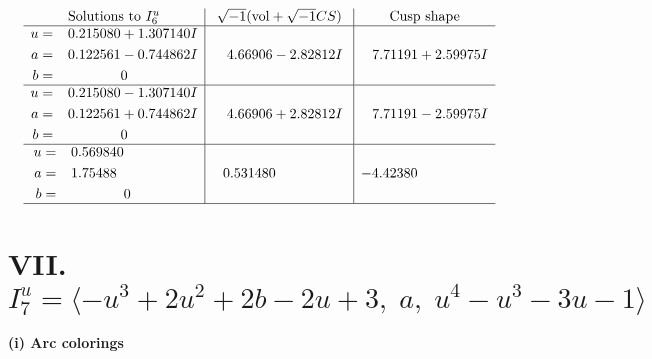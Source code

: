 \documentclass[1p]{elsarticle_modified}
\theoremstyle{definition}
\newcommand{\I}{\sqrt{-1}}
\begin{document}
$$\begin{array}{c|c|c}  
\text{Solutions to }I^u_{6}& \I (\text{vol} + \sqrt{-1}CS) & \text{Cusp shape}\\
 \hline 
\begin{aligned}
u &= \phantom{-}0.215080 + 1.307140 I \\
a &= \phantom{-}0.122561 - 0.744862 I \\
b &= \phantom{-0.000000 } 0\end{aligned}
 & \phantom{-}4.66906 - 2.82812 I & \phantom{-}7.71191 + 2.59975 I \\ \hline\begin{aligned}
u &= \phantom{-}0.215080 - 1.307140 I \\
a &= \phantom{-}0.122561 + 0.744862 I \\
b &= \phantom{-0.000000 } 0\end{aligned}
 & \phantom{-}4.66906 + 2.82812 I & \phantom{-}7.71191 - 2.59975 I \\ \hline\begin{aligned}
u &= \phantom{-}0.569840\phantom{ +0.000000I} \\
a &= \phantom{-}1.75488\phantom{ +0.000000I} \\
b &= \phantom{-0.000000 } 0\end{aligned}
 & \phantom{-}0.531480\phantom{ +0.000000I} & -4.42380\phantom{ +0.000000I}\\
 \hline 
 \end{array}$$\newpage\newpage\renewcommand{\arraystretch}{1}
\centering \section*{VII. $I^u_{7}= \langle - u^3+2 u^2+2 b-2 u+3,\;a,\;u^4- u^3-3 u-1 \rangle$}
\flushleft \textbf{(i) Arc colorings}\\
\end{document}
